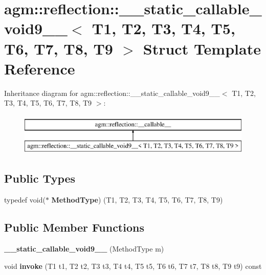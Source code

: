 \hypertarget{structagm_1_1reflection_1_1____static__callable__void9____}{}\section{agm\+:\+:reflection\+:\+:\+\_\+\+\_\+static\+\_\+callable\+\_\+void9\+\_\+\+\_\+$<$ T1, T2, T3, T4, T5, T6, T7, T8, T9 $>$ Struct Template Reference}
\label{structagm_1_1reflection_1_1____static__callable__void9____}
Inheritance diagram for agm\+:\+:reflection\+:\+:\+\_\+\+\_\+static\+\_\+callable\+\_\+void9\+\_\+\+\_\+$<$ T1, T2, T3, T4, T5, T6, T7, T8, T9 $>$\+:\begin{figure}[H]
\begin{center}
\leavevmode
\includegraphics[height=2.000000cm]{structagm_1_1reflection_1_1____static__callable__void9____}
\end{center}
\end{figure}
\subsection*{Public Types}
\begin{DoxyCompactItemize}
\item 
typedef void($\ast$ {\bfseries Method\+Type}) (T1, T2, T3, T4, T5, T6, T7, T8, T9)\hypertarget{structagm_1_1reflection_1_1____static__callable__void9_____ac40d2ff3f3ca33cf780993fe89b11e97}{}\label{structagm_1_1reflection_1_1____static__callable__void9_____ac40d2ff3f3ca33cf780993fe89b11e97}

\end{DoxyCompactItemize}
\subsection*{Public Member Functions}
\begin{DoxyCompactItemize}
\item 
{\bfseries \+\_\+\+\_\+static\+\_\+callable\+\_\+void9\+\_\+\+\_\+} (Method\+Type m)\hypertarget{structagm_1_1reflection_1_1____static__callable__void9_____a97eeccf6572f8494efe54658459fa960}{}\label{structagm_1_1reflection_1_1____static__callable__void9_____a97eeccf6572f8494efe54658459fa960}

\item 
void {\bfseries invoke} (T1 t1, T2 t2, T3 t3, T4 t4, T5 t5, T6 t6, T7 t7, T8 t8, T9 t9) const \hypertarget{structagm_1_1reflection_1_1____static__callable__void9_____acfa39bc3aaf374ae8d00328e1f607d52}{}\label{structagm_1_1reflection_1_1____static__callable__void9_____acfa39bc3aaf374ae8d00328e1f607d52}

\end{DoxyCompactItemize}
